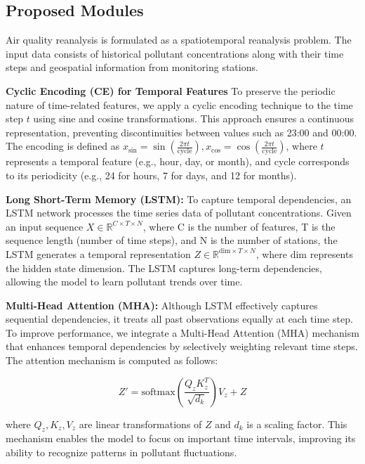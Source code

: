 \subsection{Proposed Modules}
Air quality reanalysis is formulated as a spatiotemporal reanalysis problem. The input data consists of historical pollutant concentrations along with their time steps and geospatial information from monitoring stations. 

\noindent\textbf{Cyclic Encoding (CE) for Temporal Features}
To preserve the periodic nature of time-related features, we apply a cyclic encoding technique to the time step $t$ using sine and cosine transformations. This approach ensures a continuous representation, preventing discontinuities between values such as 23:00 and 00:00. The encoding is defined as $x_{\sin} = \sin \left( \frac{2\pi t}{\text{cycle}} \right), x_{\cos} = \cos \left( \frac{2\pi t}{\text{cycle}} \right)$, where \( t \) represents a temporal feature (e.g., hour, day, or month), and cycle corresponds to its periodicity (e.g., 24 for hours, 7 for days, and 12 for months).

\noindent\textbf{Long Short-Term Memory (LSTM):} To capture temporal dependencies, an LSTM network processes the time series data of pollutant concentrations. Given an input sequence $X \in \mathbb{R}^{C \times T \times N}$, where C is the number of features, T is the sequence length (number of time steps), and N is the number of stations, the LSTM generates a temporal representation $Z \in \mathbb{R}^{\text{dim} \times T \times N}$, where \(\text{dim}\) represents the hidden state dimension. The LSTM captures long-term dependencies, allowing the model to learn pollutant trends over time.

\noindent\textbf{Multi-Head Attention (MHA):} Although LSTM effectively captures sequential dependencies, it treats all past observations equally at each time step. To improve performance, we integrate a Multi-Head Attention (MHA) mechanism that enhances temporal dependencies by selectively weighting relevant time steps. The attention mechanism is computed as follows:

\begin{small}
\begin{equation}
Z' = \text{softmax} \left( \frac{Q_zK_z^T}{\sqrt{d_k}} \right) V_z + Z
\label{eq:fm_1}
\end{equation}
\end{small}

\noindent where $Q_z, K_z, V_z$ are linear transformations of $Z$ and $d_k$ is a scaling factor. This mechanism enables the model to focus on important time intervals, improving its ability to recognize patterns in pollutant fluctuations.

